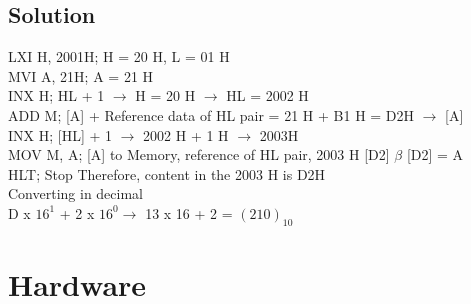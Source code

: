 \documentclass[10pt,a4paper]{article}
\begin{document}
     \subsection{Solution}
     LXI H, 2001H; H = 20 H, L = 01 H \\
     MVI A, 21H; A = 21 H \\
     INX H; HL + 1 $ \rightarrow $ H = 20 H $ \rightarrow $ HL = 2002 H \\
     ADD M; [A] + Reference data of HL pair = 21 H + B1 H = D2H $ \rightarrow $ [A] \\
     INX H; [HL] + 1 $ \rightarrow $ 2002 H + 1 H $ \rightarrow $ 2003H  \\
     MOV M, A; [A] to Memory, reference of HL pair, 2003 H [D2] $ \beta $ [D2] = A \\
     HLT; Stop
     Therefore, content in the 2003 H is D2H \\
     Converting in decimal \\
     D x $ 16^1 $ + 2 x $ 16^0 \rightarrow $ 13 x 16 + 2 = $ (210)_{10} $
     \section{Hardware}
\end{document}

